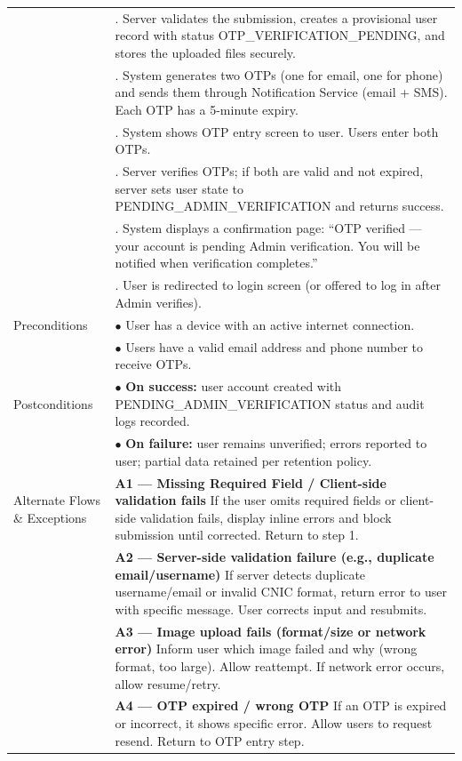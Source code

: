 \begin{longtable}{|>{\raggedright\arraybackslash}p{4cm}|>{\raggedright\arraybackslash}p{11cm}|}
& 5. Server validates the submission, creates a provisional user record with status OTP\_VERIFICATION\_PENDING, and stores the uploaded files securely. \\
& 6. System generates two OTPs (one for email, one for phone) and sends them through Notification Service (email + SMS). Each OTP has a 5-minute expiry. \\
& 7. System shows OTP entry screen to user. Users enter both OTPs. \\
& 8. Server verifies OTPs; if both are valid and not expired, server sets user state to PENDING\_ADMIN\_VERIFICATION and returns success. \\
& 9. System displays a confirmation page: ``OTP verified — your account is pending Admin verification. You will be notified when verification completes.'' \\
& 10. User is redirected to login screen (or offered to log in after Admin verifies). \\
\hline
Preconditions & $\bullet$ User has a device with an active internet connection. \\
& $\bullet$ Users have a valid email address and phone number to receive OTPs. \\
\hline
Postconditions & $\bullet$ \textbf{On success:} user account created with PENDING\_ADMIN\_VERIFICATION status and audit logs recorded. \\
& $\bullet$ \textbf{On failure:} user remains unverified; errors reported to user; partial data retained per retention policy. \\
\hline
Alternate Flows \& Exceptions & \textbf{A1 — Missing Required Field / Client-side validation fails} \newline If the user omits required fields or client-side validation fails, display inline errors and block submission until corrected. Return to step 1. \\
& \textbf{A2 — Server-side validation failure (e.g., duplicate email/username)} \newline If server detects duplicate username/email or invalid CNIC format, return error to user with specific message. User corrects input and resubmits. \\
& \textbf{A3 — Image upload fails (format/size or network error)} \newline Inform user which image failed and why (wrong format, too large). Allow reattempt. If network error occurs, allow resume/retry. \\
& \textbf{A4 — OTP expired / wrong OTP} \newline If an OTP is expired or incorrect, it shows specific error. Allow users to request resend. Return to OTP entry step. \\

\end{longtable}

